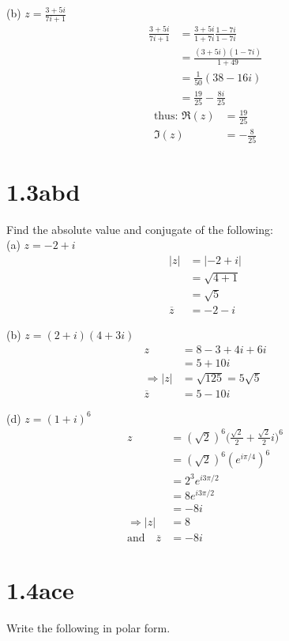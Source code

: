 \documentclass[a4paper, 11pt]{article}
\begin{document}
\noindent(b) $z= \frac{3+5i}{7i+1}$
	\begin{align*}
		\frac{3+5i}{7i+1} &= \frac{3+5i}{1+7i} \frac{1-7i}{1-7i} \\ 
			&= \frac{(3+5i)(1-7i)}{1+49} \\ 
			&= \frac{1}{50}(38 - 16i) \\
			&= \frac{19}{25}-\frac{8i}{25}
	\end{align*} 
	\begin{align*}
		\text{thus: }\Re(z) &= \frac{19}{25} \\ 
		\Im(z) &= -\frac{8}{25} 
	\end{align*}	
	
\section*{1.3abd}
Find the absolute value and conjugate of the following: \\ 

\noindent(a) $z = -2+i$
	\begin{align*}
		|z| &= |-2+i| \\ 
			&= \sqrt{4+1} \\ 
			&= \sqrt{5} \\
		\overline{z} &= -2-i
	\end{align*}
	
\noindent(b) $z=(2+i)(4+3i)$ 
	\begin{align*}
		z &= 8-3+4i+6i \\ 
			&= 5+10i \\
		\Rightarrow |z| &= \sqrt{125} = 5\sqrt{5} \\ 
		\overline{z} &= 5-10i
	\end{align*}	
	
\noindent(d) $z=(1+i)^6$ 
	\begin{align*}
		z &= (\sqrt{2})^6\Big(\frac{\sqrt{2}}{2}+\frac{\sqrt{2}}{2}i\Big)^6 \\ 
			&= (\sqrt{2})^6(e^{i\pi/4})^6 \\ 
			&= 2^3e^{i3\pi/2} \\ 
			&= 8e^{i3\pi/2} \\
			&= -8i \\
		\Rightarrow |z| &= 8 \\ 
		\text{and} \quad	\overline{z} &= -8i 	
	\end{align*} 
	
	
\section*{1.4ace}
Write the following in polar form.\\
\end{document}
